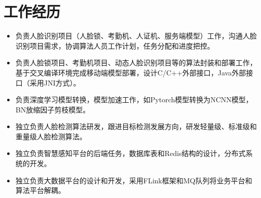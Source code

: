 \documentclass{resume}
\begin{document}
\section{工作经历}
\begin{itemize}
  \item 负责人脸识别项目（人脸锁、考勤机、人证机、服务端模型）工作，沟通人脸识别项目需求，协调算法人员工作计划，任务分配和进度把控。
  \item 负责人脸锁项目、考勤机项目、动态人脸识别项目等的算法封装和部署工作，基于交叉编译环境完成移动端模型部署，设计C/C++外部接口，Java外部接口（采用JNI方式）。
  \item 负责深度学习模型转换，模型加速工作，如Pytorch模型转换为NCNN模型，BN放缩因子剪枝模型。
  \item 独立负责人脸检测算法研发，跟进目标检测发展方向，研发轻量级、标准级和重量级人脸检测算法。
\end{itemize}
\begin{itemize}
  \item 独立负责智慧感知平台的后端任务，数据库表和Redis结构的设计，分布式系统的开发。
  \item 独立负责大数据平台的设计和开发，采用FLink框架和MQ队列将业务平台和算法平台解耦。
\end{itemize}
\end{document}
